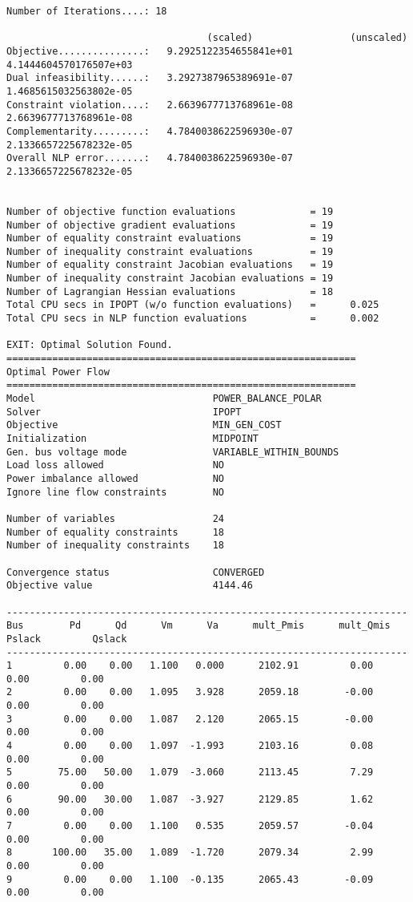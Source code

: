 \begin{lstlisting}
Number of Iterations....: 18

                                   (scaled)                 (unscaled)
Objective...............:   9.2925122354655841e+01    4.1444604570176507e+03
Dual infeasibility......:   3.2927387965389691e-07    1.4685615032563802e-05
Constraint violation....:   2.6639677713768961e-08    2.6639677713768961e-08
Complementarity.........:   4.7840038622596930e-07    2.1336657225678232e-05
Overall NLP error.......:   4.7840038622596930e-07    2.1336657225678232e-05


Number of objective function evaluations             = 19
Number of objective gradient evaluations             = 19
Number of equality constraint evaluations            = 19
Number of inequality constraint evaluations          = 19
Number of equality constraint Jacobian evaluations   = 19
Number of inequality constraint Jacobian evaluations = 19
Number of Lagrangian Hessian evaluations             = 18
Total CPU secs in IPOPT (w/o function evaluations)   =      0.025
Total CPU secs in NLP function evaluations           =      0.002

EXIT: Optimal Solution Found.
=============================================================
Optimal Power Flow
=============================================================
Model                               POWER_BALANCE_POLAR
Solver                              IPOPT
Objective                           MIN_GEN_COST
Initialization                      MIDPOINT
Gen. bus voltage mode               VARIABLE_WITHIN_BOUNDS
Load loss allowed                   NO
Power imbalance allowed             NO
Ignore line flow constraints        NO

Number of variables                 24
Number of equality constraints      18
Number of inequality constraints    18

Convergence status                  CONVERGED
Objective value                     4144.46

----------------------------------------------------------------------
Bus        Pd      Qd      Vm      Va      mult_Pmis      mult_Qmis      Pslack         Qslack        
----------------------------------------------------------------------
1         0.00    0.00   1.100   0.000      2102.91         0.00         0.00         0.00
2         0.00    0.00   1.095   3.928      2059.18        -0.00         0.00         0.00
3         0.00    0.00   1.087   2.120      2065.15        -0.00         0.00         0.00
4         0.00    0.00   1.097  -1.993      2103.16         0.08         0.00         0.00
5        75.00   50.00   1.079  -3.060      2113.45         7.29         0.00         0.00
6        90.00   30.00   1.087  -3.927      2129.85         1.62         0.00         0.00
7         0.00    0.00   1.100   0.535      2059.57        -0.04         0.00         0.00
8       100.00   35.00   1.089  -1.720      2079.34         2.99         0.00         0.00
9         0.00    0.00   1.100  -0.135      2065.43        -0.09         0.00         0.00


\end{lstlisting}

